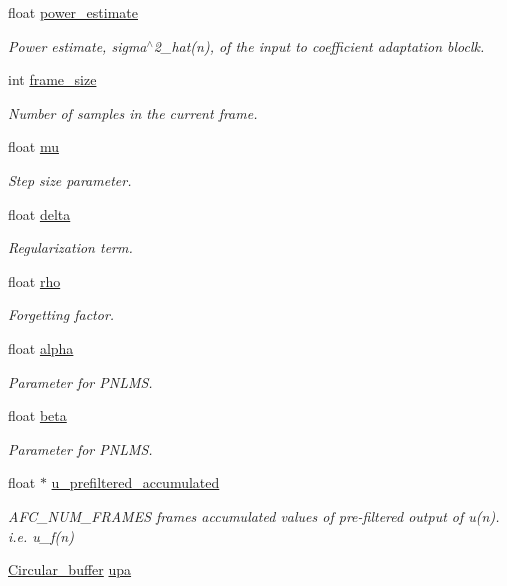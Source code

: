 \begin{DoxyCompactItemize}
float \mbox{\hyperlink{structafc__t_ab94a0e3f15733272ecd739279e132818}{power\+\_\+estimate}}
\begin{DoxyCompactList}\small\item\em Power estimate, sigma$^\wedge$2\+\_\+hat(n), of the input to coefficient adaptation bloclk. \end{DoxyCompactList}\item 
int \mbox{\hyperlink{structafc__t_acb59e5af368aca0b2840fa76e5e5a000}{frame\+\_\+size}}
\begin{DoxyCompactList}\small\item\em Number of samples in the current frame. \end{DoxyCompactList}\item 
float \mbox{\hyperlink{structafc__t_a7b343e47789c5a03ba4a37671c281861}{mu}}
\begin{DoxyCompactList}\small\item\em Step size parameter. \end{DoxyCompactList}\item 
float \mbox{\hyperlink{structafc__t_a472432ba992e61143df0a1ab83981c10}{delta}}
\begin{DoxyCompactList}\small\item\em Regularization term. \end{DoxyCompactList}\item 
float \mbox{\hyperlink{structafc__t_a8edae5604a2d189f1e83b71678566cad}{rho}}
\begin{DoxyCompactList}\small\item\em Forgetting factor. \end{DoxyCompactList}\item 
float \mbox{\hyperlink{structafc__t_a161775274c257b1d804c61b77cfbbbd7}{alpha}}
\begin{DoxyCompactList}\small\item\em Parameter for P\+N\+L\+MS. \end{DoxyCompactList}\item 
float \mbox{\hyperlink{structafc__t_a829042affbb45e80df502fc95134b673}{beta}}
\begin{DoxyCompactList}\small\item\em Parameter for P\+N\+L\+MS. \end{DoxyCompactList}\item 
float $\ast$ \mbox{\hyperlink{structafc__t_af7b50d899dcdfc8c68f6866764861f5f}{u\+\_\+prefiltered\+\_\+accumulated}}
\begin{DoxyCompactList}\small\item\em A\+F\+C\+\_\+\+N\+U\+M\+\_\+\+F\+R\+A\+M\+ES frames accumulated values of pre-\/filtered output of u(n). i.\+e. u\+\_\+f(n) \end{DoxyCompactList}\item 
\mbox{\hyperlink{circular__buffer_8h_aa88184dd60879f696cb2e679d0e50b45}{Circular\+\_\+buffer}} \mbox{\hyperlink{structafc__t_a11328ef1f3d92c69c404c5df7761116a}{upa}}
\end{DoxyCompactItemize}


